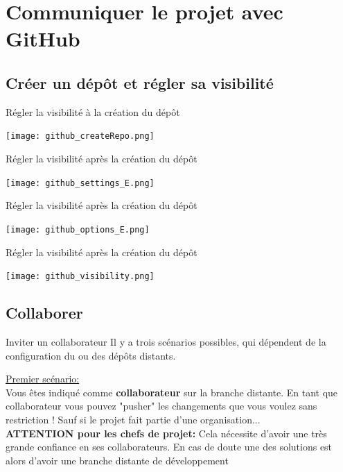 \documentclass{beamer}
\begin{document}
\section{Communiquer le projet avec GitHub}


\subsection{Créer un dépôt et régler sa visibilité}
\begin{frame}{Régler la visibilité à la création du dépôt}
\begin{center}
	\texttt{[image: github\_createRepo.png]}
\end{center}
\end{frame}

\begin{frame}{Régler la visibilité après la création du dépôt}
\begin{center}
	\texttt{[image: github\_settings\_E.png]}
\end{center}
\end{frame}

\begin{frame}{Régler la visibilité après la création du dépôt}
\begin{center}
	\texttt{[image: github\_options\_E.png]}
\end{center}
\end{frame}

\begin{frame}{Régler la visibilité après la création du dépôt}
\begin{center}
	\texttt{[image: github\_visibility.png]}
\end{center}
\end{frame}

\subsection{Collaborer}
\begin{frame}{Inviter un collaborateur}
Il y a trois scénarios possibles, qui dépendent de la configuration du ou des dépôts distants.
\medskip

\underline{Premier scénario:}\\
\smallskip
Vous êtes indiqué comme \textbf{collaborateur} sur la branche distante. En tant que collaborateur vous pouvez "pusher" les changements que vous voulez sans restriction ! Sauf si le projet fait partie d'une organisation...\\
\medskip
\textbf{ATTENTION pour les chefs de projet:} Cela nécessite d'avoir une très grande confiance en ses collaborateurs. En cas de doute une des solutions est alors d'avoir une branche distante de développement
\end{frame}
\end{document}
